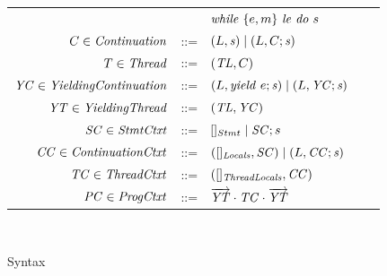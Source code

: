 \begin{figure}
\begin{tabular}{rclcl}
                  & & $\mathit{while}\ \{{e,m}\}\ {{\mathit{le}}\ } \mathit{do}\ {{s}\ }$ \\ 
$C \in \mathit{Continuation}$ & ::= & $(L,\mathit{s}) \mid (L, C;\mathit{s})$ \\
$T \in \mathit{Thread}$ & ::=  & $(\mathit{TL}, C)$ \\
$\mathit{YC} \in \mathit{YieldingContinuation}$ & ::= & $(L,\mathit{yield}\ e;\mathit{s}) \mid (L, \mathit{YC};\mathit{s})$ \\
$\mathit{YT} \in \mathit{YieldingThread}$ &::= &$(\mathit{TL}, \mathit{YC})$ \\
$\mathit{SC} \in \mathit{StmtCtxt}$ &::= &$[]_{Stmt} \mid \mathit{SC};s$ \\
$\mathit{CC} \in \mathit{ContinuationCtxt}$ &::= & $([]_{\mathit{Locals}}, \mathit{SC}) \mid (L,\mathit{CC};\mathit{s})$ \\
$\mathit{TC} \in \mathit{ThreadCtxt}$ &::= &$([]_{\mathit{ThreadLocals}}, \mathit{CC})$ \\
$\mathit{PC} \in \mathit{ProgCtxt}$ &::= &$\overrightarrow{\mathit{YT}} \cdot \mathit{TC} \cdot \overrightarrow{\mathit{YT}}$ \\
\end{tabular}\\
\setlength{\tabcolsep}{6pt}
\caption{Syntax}
\label{fig:syntax}
\end{figure}

